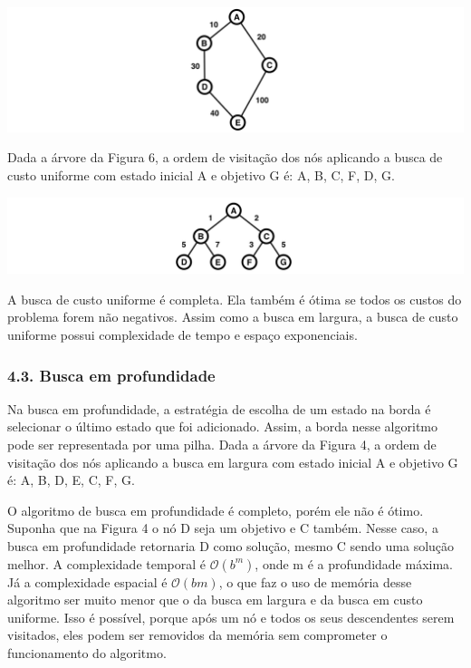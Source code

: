 \documentclass[brazil,]{article}
\let\origfigure=\figure
\let\endorigfigure=\endfigure
\renewenvironment{figure}[1][]{%
\origfigure[H]
}{%
\endorigfigure
}
\begin{document}
\begin{figure}
\centering
\includegraphics{grafo.png}
\caption{Grafo para ilustrar a troca de nós na borda numa busca de custo
uniforme.}
\end{figure}

Dada a árvore da Figura 6, a ordem de visitação dos nós aplicando a
busca de custo uniforme com estado inicial A e objetivo G é: A, B, C, F,
D, G.

\begin{figure}
\centering
\includegraphics{arvore-custos.png}
\caption{Árvore com custos.}
\end{figure}

A busca de custo uniforme é completa. Ela também é ótima se todos os
custos do problema forem não negativos. Assim como a busca em largura, a
busca de custo uniforme possui complexidade de tempo e espaço
exponenciais.

\subsubsection{4.3. Busca em profundidade}\label{busca-em-profundidade}

Na busca em profundidade, a estratégia de escolha de um estado na borda
é selecionar o último estado que foi adicionado. Assim, a borda nesse
algoritmo pode ser representada por uma pilha. Dada a árvore da Figura
4, a ordem de visitação dos nós aplicando a busca em largura com estado
inicial A e objetivo G é: A, B, D, E, C, F, G.

O algoritmo de busca em profundidade é completo, porém ele não é ótimo.
Suponha que na Figura 4 o nó D seja um objetivo e C também. Nesse caso,
a busca em profundidade retornaria D como solução, mesmo C sendo uma
solução melhor. A complexidade temporal é \(\mathcal{O}(b^m)\), onde m é
a profundidade máxima. Já a complexidade espacial é \(\mathcal{O}(bm)\),
o que faz o uso de memória desse algoritmo ser muito menor que o da
busca em largura e da busca em custo uniforme. Isso é possível, porque
após um nó e todos os seus descendentes serem visitados, eles podem ser
removidos da memória sem comprometer o funcionamento do algoritmo.
\end{document}
